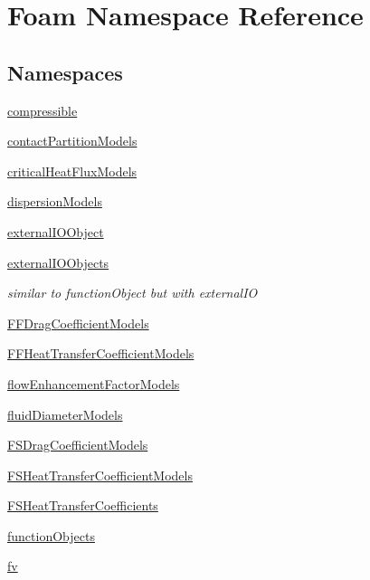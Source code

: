 \hypertarget{namespaceFoam}{}\section{Foam Namespace Reference}
\label{namespaceFoam}
\subsection*{Namespaces}
\begin{DoxyCompactItemize}
\item 
 \hyperlink{namespaceFoam_1_1compressible}{compressible}
\item 
 \hyperlink{namespaceFoam_1_1contactPartitionModels}{contact\+Partition\+Models}
\item 
 \hyperlink{namespaceFoam_1_1criticalHeatFluxModels}{critical\+Heat\+Flux\+Models}
\item 
 \hyperlink{namespaceFoam_1_1dispersionModels}{dispersion\+Models}
\item 
 \hyperlink{namespaceFoam_1_1externalIOObject}{external\+I\+O\+Object}
\item 
 \hyperlink{namespaceFoam_1_1externalIOObjects}{external\+I\+O\+Objects}
\begin{DoxyCompactList}\small\item\em similar to function\+Object but with external\+IO \end{DoxyCompactList}\item 
 \hyperlink{namespaceFoam_1_1FFDragCoefficientModels}{F\+F\+Drag\+Coefficient\+Models}
\item 
 \hyperlink{namespaceFoam_1_1FFHeatTransferCoefficientModels}{F\+F\+Heat\+Transfer\+Coefficient\+Models}
\item 
 \hyperlink{namespaceFoam_1_1flowEnhancementFactorModels}{flow\+Enhancement\+Factor\+Models}
\item 
 \hyperlink{namespaceFoam_1_1fluidDiameterModels}{fluid\+Diameter\+Models}
\item 
 \hyperlink{namespaceFoam_1_1FSDragCoefficientModels}{F\+S\+Drag\+Coefficient\+Models}
\item 
 \hyperlink{namespaceFoam_1_1FSHeatTransferCoefficientModels}{F\+S\+Heat\+Transfer\+Coefficient\+Models}
\item 
 \hyperlink{namespaceFoam_1_1FSHeatTransferCoefficients}{F\+S\+Heat\+Transfer\+Coefficients}
\item 
 \hyperlink{namespaceFoam_1_1functionObjects}{function\+Objects}
\item 
 \hyperlink{namespaceFoam_1_1fv}{fv}

\end{DoxyCompactItemize}
